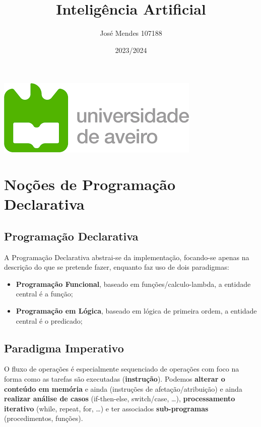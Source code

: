 \documentclass{article}
\title{Inteligência Artificial}
\author{José Mendes 107188}
\date{2023/2024}
\begin{document}
\begin{titlepage}
    \maketitle
    \begin{center}
        \includegraphics[scale=0.4]{UA.png}
    \end{center}
    \thispagestyle{empty} %
\end{titlepage}

\pagebreak

\section{Noções de Programação Declarativa}

\subsection{Programação Declarativa}

A Programação Declarativa abstrai-se da implementação, focando-se
apenas na descrição do que se pretende fazer, enquanto faz uso de dois
paradigmas:
\begin{itemize}
  \item \textbf{Programação Funcional}, baseado em funções/calculo-lambda, a entidade central é a função;
  \item \textbf{Programação em Lógica}, baseado em lógica de primeira ordem, a entidade central é o predicado;
\end{itemize}


\subsection{Paradigma Imperativo}

O fluxo de operações é especialmente sequenciado de operações com
foco na forma como as tarefas são executadas (\textbf{instrução}). Podemos \textbf{alterar
o conteúdo em memória} e ainda (instruções de afetação/atribuição) e ainda
\textbf{realizar análise de casos} (if-then-else, switch/case, \dots), \textbf{processamento
iterativo} (while, repeat, for, \dots) e ter associados \textbf{sub-programas} (procedimentos,
funções).
\end{document}
